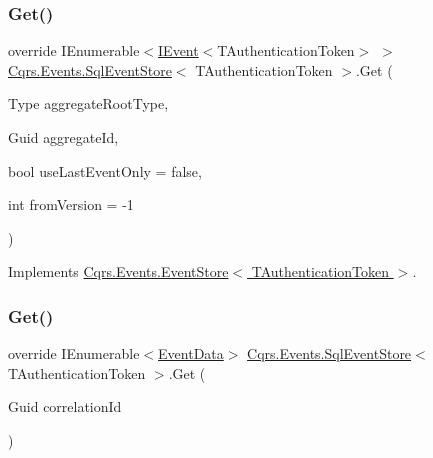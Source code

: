 \subsubsection{\texorpdfstring{Get()}{Get()}\hspace{0.1cm}{\footnotesize\ttfamily [1/2]}}
{\footnotesize\ttfamily override I\+Enumerable$<$\hyperlink{interfaceCqrs_1_1Events_1_1IEvent}{I\+Event}$<$T\+Authentication\+Token$>$ $>$ \hyperlink{classCqrs_1_1Events_1_1SqlEventStore}{Cqrs.\+Events.\+Sql\+Event\+Store}$<$ T\+Authentication\+Token $>$.Get (\begin{DoxyParamCaption}\item[{Type}]{aggregate\+Root\+Type,  }\item[{Guid}]{aggregate\+Id,  }\item[{bool}]{use\+Last\+Event\+Only = {\ttfamily false},  }\item[{int}]{from\+Version = {\ttfamily -\/1} }\end{DoxyParamCaption})\hspace{0.3cm}{\ttfamily [virtual]}}



Implements \hyperlink{classCqrs_1_1Events_1_1EventStore_aa1d0d399a35c1e3b0759e27202695d8b_aa1d0d399a35c1e3b0759e27202695d8b}{Cqrs.\+Events.\+Event\+Store$<$ T\+Authentication\+Token $>$}.

\mbox{\label{classCqrs_1_1Events_1_1SqlEventStore_ac1fb2bdec07cbeec57fb3d985e7a8b31_ac1fb2bdec07cbeec57fb3d985e7a8b31}} 
\subsubsection{\texorpdfstring{Get()}{Get()}\hspace{0.1cm}{\footnotesize\ttfamily [2/2]}}
{\footnotesize\ttfamily override I\+Enumerable$<$\hyperlink{classCqrs_1_1Events_1_1EventData}{Event\+Data}$>$ \hyperlink{classCqrs_1_1Events_1_1SqlEventStore}{Cqrs.\+Events.\+Sql\+Event\+Store}$<$ T\+Authentication\+Token $>$.Get (\begin{DoxyParamCaption}\item[{Guid}]{correlation\+Id }\end{DoxyParamCaption})\hspace{0.3cm}{\ttfamily [virtual]}}



